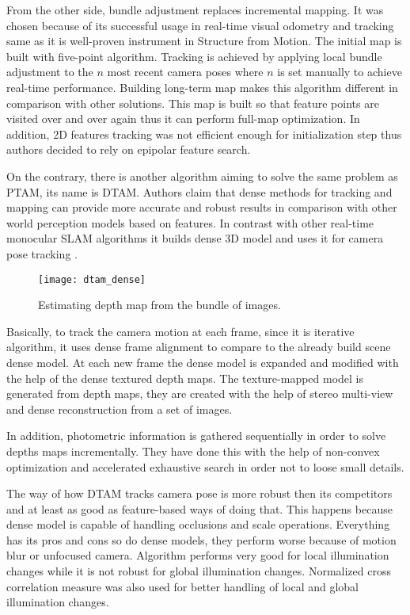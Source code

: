 \documentclass[../../../../main]{subfiles}
\begin{document}
From the other side, bundle adjustment replaces incremental mapping. It was chosen because of its successful usage in real-time visual odometry and tracking same as it is well-proven instrument in Structure from Motion. The initial map is built with five-point algorithm. Tracking is achieved by applying local bundle adjustment to the $n$ most recent camera poses where $n$ is set manually to achieve real-time performance. Building long-term map makes this algorithm different in comparison with other solutions. This map is built so that feature points are visited over and over again thus it can perform full-map optimization. In addition, 2D features tracking was not efficient enough for initialization step thus authors decided to rely on epipolar feature search.

On the contrary, there is another algorithm aiming to solve the same problem as \ac{PTAM}, its name is \ac{DTAM}. Authors claim that dense methods for tracking and mapping can provide more accurate and robust results in comparison with other world perception models based on features. In contrast with other real-time monocular \ac{SLAM} algorithms it builds dense 3D model and uses it for camera pose tracking \cite{dtam}.


\begin{figure} [ht!]
    \begin{center}
        \texttt{[image: dtam\_dense]}
        \caption{Estimating depth map from the bundle of images.}
        \label{fig:slam}
    \end{center}
\end{figure}

Basically, to track the camera motion at each frame, since it is iterative algorithm, it uses dense frame alignment to compare to the already build scene dense model. At each new frame the dense model is expanded and modified with the help of the dense textured depth maps. The texture-mapped model is generated from depth maps, they are created with the help of stereo multi-view and dense reconstruction from a set of images.

In addition, photometric information is gathered sequentially in order to solve depths maps incrementally. They have done this with the help of non-convex optimization and accelerated exhaustive search in order not to loose small details.

The way of how \ac{DTAM} tracks camera pose is more robust then its competitors and at least as good as feature-based ways of doing that. This happens because dense model is capable of handling occlusions and scale operations. Everything has its pros and cons so do dense models, they perform worse because of motion blur or unfocused camera. Algorithm performs very good for local illumination changes while it is not robust for global illumination changes. Normalized cross correlation measure was also used for better handling of local and global illumination changes.
\end{document}
